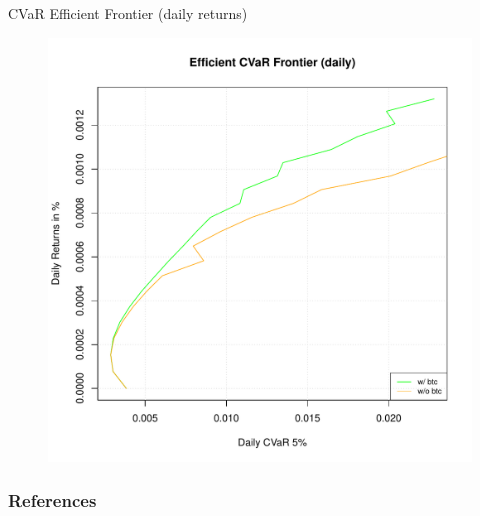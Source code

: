 \documentclass{beamer}
\begin{document}
\begin{frame}{CVaR Efficient Frontier (daily returns)}
\begin{figure}
	\includegraphics[height= 0.8\textheight]{frontier_daily.pdf}
\end{figure}
\end{frame}



\begin{frame}[allowframebreaks] %
\frametitle{References}

\scriptsize{}


\end{frame}
\end{document}
